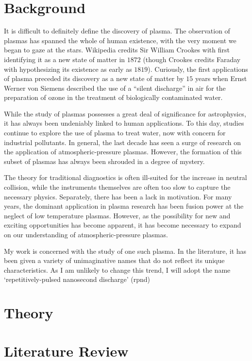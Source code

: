 \section{Background}
It is difficult to definitely define the discovery of plasma. The observation of
plasmas has spanned the whole of human existence, with the very moment we began
to gaze at the stars. Wikipedia credits Sir William Crookes with first
identifying it as a new state of matter in $1872$ (though Crookes credits
Faraday with hypothesizing its existence as early as $1819$). Curiously, the
first applications of plasma preceded its discovery as a new state of matter by
$15$ years when Ernst Werner von Siemens described the use of a ``silent
discharge'' in air for the preparation of ozone in the treatment of biologically
contaminated water.

While the study of plasmas possesses a great deal of significance for
astrophysics, it has always been undeniably linked to human applications.  To
this day, studies continue to explore the use of plasma to treat water, now with
concern for industrial pollutants. In general, the last decade has seen a surge
of research on the application of atmospheric-pressure plasmas. However, the
formation of this subset of plasmas has always been shrouded in a degree of
mystery.

The theory for traditional diagnostics is often ill-suited for the increase in
neutral collision, while the instruments themselves are often too slow to
capture the necessary physics. Separately, there has been a lack in motivation.
For many years, the dominant application in plasma research has been fusion
power at the neglect of low temperature plasmas. However, as the possibility for
new and exciting opportunities has become apparent, it has become necessary to
expand on our understanding of atmospheric-pressure plasmas.

My work is concerned with the study of one such plasma. In the literature, it
has been given a variety of unimaginative names that do not reflect its unique
characteristics. As I am unlikely to change this trend, I will adopt the name
`repetitively-pulsed nanosecond discharge' (\ac{rpnd})

\section{Theory}

\section{Literature Review}

